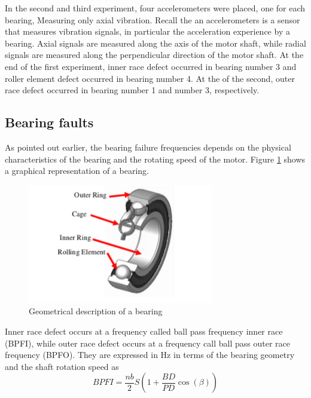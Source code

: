 \documentclass[../Main/thesis.tex]{subfiles}
\begin{document}
In the second and third experiment, four accelerometers were placed, one for each bearing, Measuring only axial vibration.
Recall the an accelerometers is a sensor that measures vibration signals, in particular the acceleration experience by a bearing. Axial signals are measured along the axis of the motor shaft, while radial signals are measured along the perpendicular direction of the motor shaft.
\justify
At the end of the first experiment, inner race defect occurred in bearing number 3 and roller element defect occurred in bearing number 4. At the of the second, outer race defect occurred in bearing number 1 and number 3, respectively. 



\subsection{Bearing faults}
\label{sec:fault}
As pointed out earlier, the bearing failure frequencies depends on the physical characteristics of the bearing and the rotating speed of the motor. Figure \ref{fig:bearing} shows a graphical representation of a bearing.
\begin{figure}[H] %
   \centering
   \includegraphics[width=3.2in]{../fig/bearing}  
   \caption{Geometrical description of a bearing}
   \label{fig:bearing}
\end{figure}
\justify
 Inner race defect occurs at a frequency called ball pass frequency inner race (BPFI), while outer race defect occurs at a frequency call ball pass outer race frequency (BPFO). They are expressed in Hz in terms of the bearing geometry and the shaft rotation speed as 
\begin{equation}\label{eq:bpfi}
BPFI = \frac{nb}{2}S\left( 1 +  \frac{BD}{PD}\cos(\beta)  \right)
\end{equation}
\end{document}
